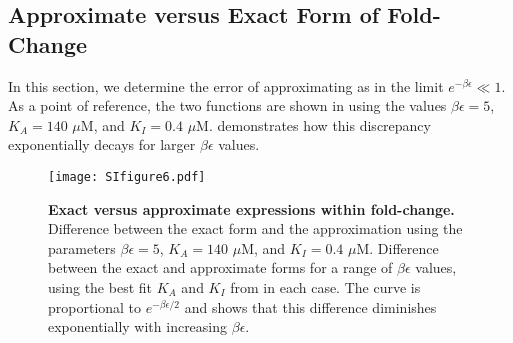 \subsection{Approximate versus Exact Form of Fold-Change}

In this section, we determine the error of approximating \eref[eqSIstep2] as
\eref[eqSIstep3] in the limit $e^{- \beta \epsilon} \ll 1$. As a point of
reference, the two functions are shown in \fref[SIfig6] using the
values $\beta \epsilon = 5$, $K_A = 140\,\,\mu\text{M}$, and $K_I =
0.4\,\,\mu\text{M}$. \fref[SIfig6] demonstrates how this discrepancy
exponentially decays for larger $\beta \epsilon$ values.

\begin{figure}[h]
	\centering \texttt{[image: SIfigure6.pdf]} \caption{{\bf Exact versus
			approximate expressions within fold-change.}  Difference between
		the exact form \eref[eqSIstep2] and the approximation \eref[eqSIstep3] using
		the parameters $\beta \epsilon = 5$, $K_A = 140\,\,\mu\text{M}$, and $K_I =
		0.4\,\,\mu\text{M}$.  Difference between the exact and
		approximate forms for a range of $\beta \epsilon$ values, using the best fit
		$K_A$ and $K_I$ from \fref[SIfig5] in each case. The curve is
		proportional to $e^{-\beta \epsilon/2}$ and shows that this difference
		diminishes exponentially with increasing $\beta \epsilon$.} \label{SIfig6}
\end{figure}

